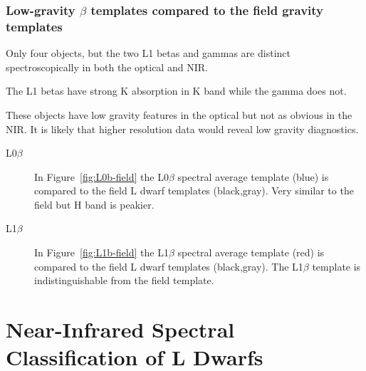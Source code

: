 \documentclass[12pt,preprint]{aastex}
\begin{document}
\subsubsection{Low-gravity $\beta$ templates compared to the field gravity templates}

Only four objects, but the two L1 betas and gammas are distinct spectroscopically in both the optical and NIR.

The L1 betas have strong K absorption in K band while the gamma does not.

These objects have low gravity features in the optical but not as obvious in the NIR.
It is likely that higher resolution data would reveal low gravity diagnostics.

\begin{description}
\item[L0$\beta$]{
In Figure~\ref{fig:L0b-field} the L0$\beta$ spectral average template (blue) is compared to the field L dwarf templates (black,gray). Very similar to the field but H band is peakier.}

\item[L1$\beta$]{
In Figure~\ref{fig:L1b-field} the L1$\beta$ spectral average template (red) is compared to the field L dwarf templates (black,gray). The L1$\beta$ template is indistinguishable from the field template.
}
\end{description}

\clearpage
\section{Near-Infrared Spectral Classification of L Dwarfs}
\label{sec:classification}
\end{document}

